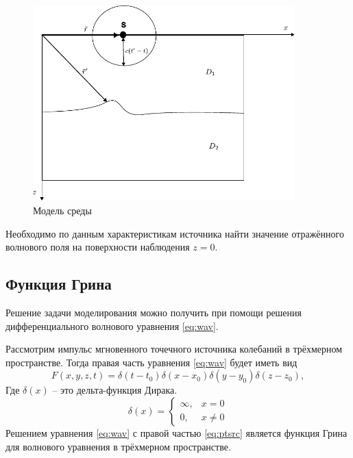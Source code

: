 \documentclass[a4paper, fontsize=14pt]{article}
\begin{document}
	\begin{figure}[h]
		
		\centering
		\includegraphics[width=0.9\textwidth]{migration_fig.pdf}
		
		\caption{Модель среды}
		\label{fig:mig}
	\end{figure}
	Необходимо по данным характеристикам источника найти значение отражённого волнового поля
	на поверхности наблюдения $z=0$.
	


	\subsection{Функция Грина} 
		Решение задачи моделирования можно получить при помощи решения
	дифференциального волнового уравнения  \eqref{eq:wav}.

	Рассмотрим импульс мгновенного точечного источника колебаний в трёхмерном пространстве.
	Тогда правая часть уравнения \eqref{eq:wav} будет иметь вид \cite{zhdanov1988}
	\begin{equation}
		F(x,y,z,t) = \delta(t-t_0)\delta(x-x_0)\delta(y-y_0)\delta(z-z_0),
		\label{eq:ptsrc}
	\end{equation}
	Где $\delta(x)$ -- это дельта-функция Дирака.
	\begin{equation}
		\delta(x)=\begin{cases}
			\infty,&x=0\\
			0,&x\neq 0
		\end{cases}
		\label{eq:deltadef}
	\end{equation}	
	Решением уравнения \eqref{eq:wav} с правой частью \eqref{eq:ptsrc} является функция
	Грина для волнового уравнения в трёхмерном пространстве.
	
\end{document}
